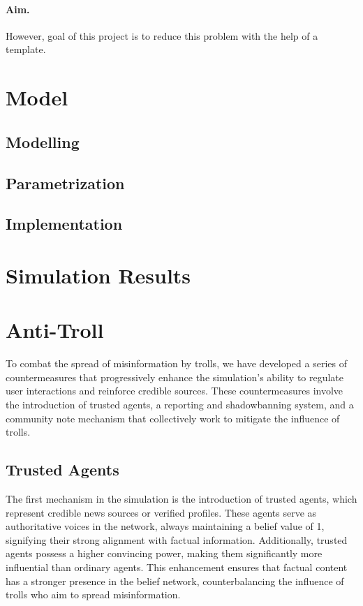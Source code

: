 \documentclass[a4paper,11pt]{scrartcl}
\begin{document}
\paragraph{Aim.} However, goal of this project is to reduce this problem with the help of a template.

\section{Model}
\subsection{Modelling}
\label{sec:modelling}

\subsection{Parametrization}

\subsection{Implementation}

\section{Simulation Results}

\section{Anti-Troll}
To combat the spread of misinformation by trolls, we have developed a series of countermeasures that progressively enhance the simulation's ability to regulate user interactions and reinforce credible sources. These countermeasures involve the introduction of trusted agents, a reporting and shadowbanning system, and a community note mechanism that collectively work to mitigate the influence of trolls.
\subsection{Trusted Agents}
The first mechanism in the simulation is the introduction of trusted agents, which represent credible news sources or verified profiles. These agents serve as authoritative voices in the network, always maintaining a belief value of 1, signifying their strong alignment with factual information. Additionally, trusted agents possess a higher convincing power, making them significantly more influential than ordinary agents. This enhancement ensures that factual content has a stronger presence in the belief network, counterbalancing the influence of trolls who aim to spread misinformation.
\end{document}

